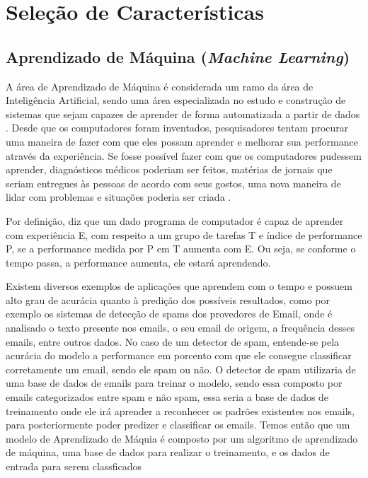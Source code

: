 \chapter[Seleção de Características]{Seleção de Características}
\label{ch:caracteristicas}

\section{Aprendizado de Máquina (\textit{Machine Learning})}

A área de Aprendizado de Máquina é considerada um ramo da área de Inteligência Artificial, sendo uma
área especializada no estudo e construção de sistemas que sejam capazes de aprender de
forma automatizada a partir de dados \cite{brink2014}. Desde que os computadores foram inventados, pesquisadores tentam procurar uma maneira de fazer com que eles possam aprender e melhorar sua performance através da experiência. Se fosse possível fazer com que os computadores pudessem aprender, diagnósticos médicos poderiam ser feitos, matérias de jornais que seriam entregues às pessoas de acordo com seus gostos, uma nova maneira de lidar com problemas e situações poderia ser criada \cite{mitchell_1997}.

Por definição,  diz que um dado programa de computador é capaz de aprender com experiência E, com respeito a um grupo de tarefas T e índice de performance P, se a performance medida por P em T aumenta com E. Ou seja, se conforme o tempo passa, a performance aumenta, ele estará aprendendo.

Existem diversos exemplos de aplicações que aprendem com o tempo e possuem alto grau de acurácia quanto à predição dos possíveis resultados, como por exemplo os sistemas de detecção de spams dos provedores de Email, onde é analisado o texto presente nos emails, o seu email de origem, a frequência desses emails, entre outros dados. No caso de um detector de spam, entende-se pela acurácia do modelo a performance em porcento com que ele consegue classificar corretamente um email, sendo ele spam ou não. O detector de spam utilizaria de uma base de dados de emails para treinar o modelo, sendo essa composto por emails categorizados entre spam e não spam, essa seria a base de dados de treinamento onde ele irá aprender a reconhecer os padrões existentes nos emails, para posteriormente poder predizer e classificar os emails. Temos então que um modelo de Aprendizado de Máquia é composto por um algoritmo de aprendizado de máquina, uma base de dados para realizar o treinamento, e os dados de entrada para serem classficados \cite{mitchell_1997}


